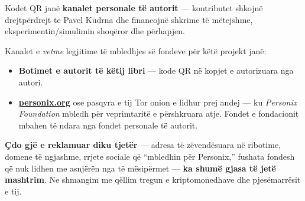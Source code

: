 \begin{minipage}[t]{0.60\textwidth}
\vspace{0pt}
\begin{mdframed}[
  linewidth=0.7pt,roundcorner=5pt,
  innerleftmargin=10pt,innerrightmargin=10pt,
  innertopmargin=8pt,innerbottommargin=8pt,
  skipabove=0pt,skipbelow=0pt,
  linecolor=cbwarning!50,backgroundcolor=cbwarning!5,
  nobreak=true,
  needspace=4\baselineskip,
]
\footnotesize
Kodet QR janë \textbf{kanalet personale të autorit} --- kontributet shkojnë drejtpërdrejt te Pavel Kudrna dhe financojnë shkrime të mëtejshme, eksperimentin/simulimin shoqëror dhe përhapjen.

\smallskip
Kanalet e \emph{vetme} legjitime të mbledhjes së fondeve për këtë projekt janë:

\smallskip
\begin{itemize}
\setlength{\itemsep}{0pt}
\setlength{\topsep}{0pt}
\item \textbf{Botimet e autorit të këtij libri} --- kode QR në kopjet e autorizuara nga autori.
\item \href{https://personix.org}{\textbf{personix.org}} ose pasqyra e tij Tor onion e lidhur prej andej --- ku \emph{Personix Foundation} mbledh për veprimtaritë e përshkruara atje. Fondet e fondacionit mbahen të ndara nga fondet personale të autorit.
\end{itemize}

\smallskip
\textbf{Çdo gjë e reklamuar diku tjetër} --- adresa të zëvendësuara në ribotime, domene të ngjashme, rrjete sociale që ``mbledhin për Personix,'' fushata fondesh që nuk lidhen me asnjërën nga të mësipërmet --- \textbf{ka shumë gjasa të jetë mashtrim}. Ne shmangim me qëllim tregun e kriptomonedhave dhe pjesëmarrësit e tij.
\end{mdframed}
\end{minipage}

\clearpage
